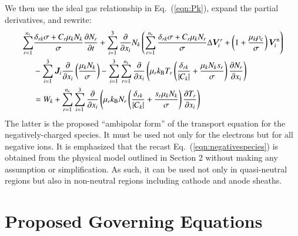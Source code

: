 \documentclass{warpdoc}
\newcommand{\alb}{\vspace{0.1cm}\\} %
\newcommand{\ns}{{n_{\rm s}}}
\renewcommand{\vec}[1]{\bm{#1}}
\begin{document}
%
We then use the ideal gas relationship in Eq.\ (\ref{eqn:Pk}), expand the partial derivatives, and rewrite:
%
\begin{align}
  \sum_{r=1}^{\ns} &\frac{\delta_{rk}\sigma+C_r  \mu_k N_k}{\sigma} \frac{\partial N_r}{\partial t}  
+ \sum_{i=1}^3 \frac{\partial}{\partial x_i}   N_k \left(\sum_{r=1}^\ns \frac{\delta_{rk}\sigma+C_r  \mu_k N_r}{\sigma} \Delta \vec{V}_i^r +\left(1+\frac{\mu_k\rho_{\rm c}}{\sigma}\right)\vec{V}^{\rm n}_i\right) 
\nonumber\alb
&- \sum_{i=1}^3 \vec{J}_i \frac{\partial}{\partial x_i}  \left( \frac{\mu_k N_k}{\sigma} 
\right) 
- \sum_{i=1}^3 \sum_{r=1}^{\ns} \frac{\partial}{\partial x_i} \left(\mu_r k_{\rm B} T_r\left(\frac{ \delta_{rk} }{ |C_k|}+   \frac{ \mu_k N_k s_r}{\sigma}\right)  \frac{\partial N_r}{\partial x_i}\right) 
\nonumber\alb
&= W_k
+ \sum_{r=1}^\ns \sum_{i=1}^3  \frac{\partial}{\partial x_i} \left( \mu_r k_{\rm B} N_r   \left(\frac{\delta_{rk}}{|C_k|}+\frac{s_r \mu_k N_k}{\sigma}\right)  \frac{\partial T_r}{\partial x_i} \right)
\label{eqn:negativespecies}
\end{align}
%
The latter is the proposed ``ambipolar form'' of the transport equation for the negatively-charged species. It must be used not only for the electrons but for all negative ions. It is emphasized that the recast Eq.\ (\ref{eqn:negativespecies}) is obtained from the physical model outlined in Section 2 without making any assumption or simplification. As such, it can be used not only in quasi-neutral regions but also in non-neutral regions including cathode and anode sheaths. 






\section{Proposed Governing Equations}
\end{document}
